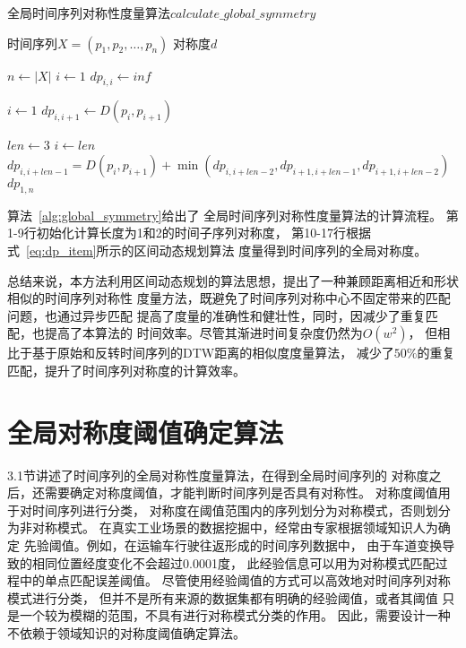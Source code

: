 \renewcommand{\algorithmicrequire}{\textbf{输入：}\unskip}
\renewcommand{\algorithmicensure}{\textbf{输出：}\unskip}

\begin{algorithm}
  \caption{全局时间序列对称性度量算法$calculate\_global\_symmetry$}
  \label{alg:global_symmetry}
  \small
  \begin{algorithmic}
    \REQUIRE 时间序列$X=\left(p_{1}, p_{2}, \dots, p_{n}\right)$
    \ENSURE 对称度$d$

    \STATE $n \leftarrow \left|X\right|$
    \STATE $i \leftarrow 1$
    \STATE $dp_{i,i} \leftarrow inf$
    \ENDWHILE

    \STATE $i \leftarrow 1$
    \STATE $dp_{i,i+1} \leftarrow D\left(p_{i}, p_{i+1}\right)$
    \ENDWHILE

    \STATE $len \leftarrow 3$
    \STATE $i \leftarrow len$
    \STATE $dp_{i,i+len-1} = D\left(p_{i}, p_{i+1}\right)+\min \left(dp_{i,i+len-2},dp_{i+1,i+len-1},dp_{i+1,i+len-2}\right)$
    \ENDWHILE
    \ENDWHILE
    \RETURN $dp_{1,n}$
  \end{algorithmic}
\end{algorithm}

算法~\ref{alg:global_symmetry}给出了
全局时间序列对称性度量算法的计算流程。
第1-9行初始化计算长度为1和2的时间子序列对称度，
第10-17行根据式~\ref{eq:dp_item}所示的区间动态规划算法
度量得到时间序列的全局对称度。

总结来说，本方法利用区间动态规划的算法思想，提出了一种兼顾距离相近和形状相似的时间序列对称性
度量方法，既避免了时间序列对称中心不固定带来的匹配问题，也通过异步匹配
提高了度量的准确性和健壮性，同时，因减少了重复匹配，也提高了本算法的
时间效率。尽管其渐进时间复杂度仍然为$O\left(w^{2}\right)$，
但相比于基于原始和反转时间序列的DTW距离的相似度度量算法，
减少了$50 \%$的重复匹配，提升了时间序列对称度的计算效率。

\section{全局对称度阈值确定算法}

3.1节讲述了时间序列的全局对称性度量算法，在得到全局时间序列的
对称度之后，还需要确定对称度阈值，才能判断时间序列是否具有对称性。
对称度阈值用于对时间序列进行分类，
对称度在阈值范围内的序列划分为对称模式，否则划分为非对称模式。
在真实工业场景的数据挖掘中，经常由专家根据领域知识人为确定
先验阈值。例如，在运输车行驶往返形成的时间序列数据中，
由于车道变换导致的相同位置经度变化不会超过0.0001度，
此经验信息可以用为对称模式匹配过程中的单点匹配误差阈值。
尽管使用经验阈值的方式可以高效地对时间序列对称模式进行分类，
但并不是所有来源的数据集都有明确的经验阈值，或者其阈值
只是一个较为模糊的范围，不具有进行对称模式分类的作用。
因此，需要设计一种不依赖于领域知识的对称度阈值确定算法。

